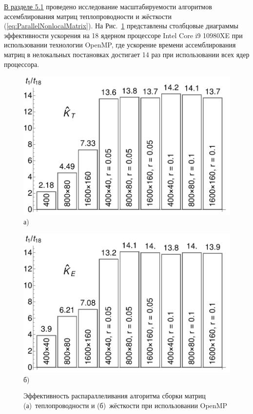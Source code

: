 \underline{В разделе 5.1} проведено исследование масштабируемости алгоритмов ассемблирования матриц теплопроводности и жёсткости (\ref{eq:ParallelNonlocalMatrix}). На Рис.~\ref{fig:OMPParallelization} представлены столбцовые диаграммы эффективности ускорения на 18 ядерном процессоре Intel Core i9
10980XE при использовании технологии OpenMP, где ускорение времени ассемблирования матриц в нелокальных постановках достигает 14 раз при использовании всех ядер процессора.

\begin{figure}[ht]
    \begin{minipage}[b][][b]{0.4\linewidth}\centering
        \includegraphics[width=\linewidth]{pics/OMPThermal.pdf} \\ а)
    \end{minipage}
    \hfill
    \begin{minipage}[b][][b]{0.4\linewidth}\centering
        \includegraphics[width=\linewidth]{pics/OMPMechanical.pdf} \\ б)
    \end{minipage}
    \caption{Эффективность распараллеливания алгоритма сборки матриц (а)~теплопроводности и (б)~жёсткости при использовании OpenMP}
    \label{fig:OMPParallelization}
\end{figure}

